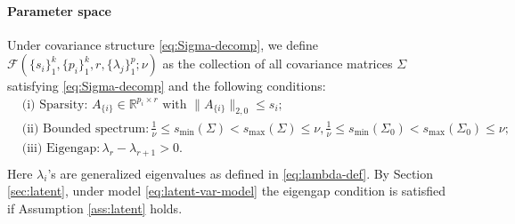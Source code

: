 \documentclass[11pt]{article}
\newcommand{\nb}[1]{\textcolor{orange}{\texttt{[#1]}}}
\newcommand{\blue}{\color{black}}
\newcommand{\dc}[1]{\{#1\}} %
\newcommand{\eigen}{s} %
\newcommand{\0}{{\mathbf{0}}}
\begin{document}
\paragraph{Parameter space}
Under 
covariance structure \eqref{eq:Sigma-decomp}, 
we define 
 $\mathcal{F}(\{s_i\}_1^k,\{p_i\}_1^k,r,\{\lambda_j\}_1^p;\nu)$
as the collection of all covariance matrices $\Sigma$ satisfying \eqref{eq:Sigma-decomp} and the following conditions:
\begin{equation}\label{parameter space}
\begin{aligned}
&\text{(i) Sparsity: $A_{\dc{i}}\in \mathbb{R}^{p_i\times r}$ with $\|A_{\dc{i}}\|_{2,0}\leq s_i$;}\\
&\text{(ii) Bounded spectrum}: 
 \frac{1}{\nu}\leq{\eigen_{\min}(\Sigma)<\eigen_{\max}(\Sigma)}\leq \nu, \frac{1}{\nu}\leq{\eigen_{\min}(\Sigma_0)<\eigen_{\max}(\Sigma_0)}\leq\nu;\\
&\text{(iii) Eigengap}: \lambda_{r}-\lambda_{r+1}>0.\\
\end{aligned}
\end{equation}
Here $\lambda_i$'s are generalized eigenvalues as defined in \eqref{eq:lambda-def}.
By Section \ref{sec:latent},  under model \eqref{eq:latent-var-model} the eigengap condition is satisfied if Assumption \ref{ass:latent} holds.
\end{document}
